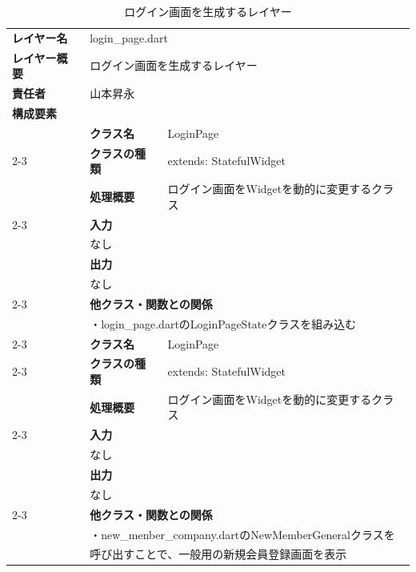 \documentclass{article}
\begin{document}
\begin{table}[htbp]
\centering
\caption{ログイン画面を生成するレイヤー}
\begin{tabularx}{\linewidth}{llp{20cm}}
    
    \cellcolor[HTML]{C0C0C0}\textbf{レイヤー名} & \multicolumn{2}{l}{login\_page.dart} \\ 
    \cellcolor[HTML]{C0C0C0}\textbf{レイヤー概要} & \multicolumn{2}{l}{ログイン画面を生成するレイヤー} \\
    \cellcolor[HTML]{C0C0C0}\textbf{責任者} & \multicolumn{2}{l}{山本昇永} \\ 
    \midrule
    \multicolumn{1}{l}{\cellcolor[HTML]{C0C0C0}\textbf{構成要素}}       & \multicolumn{2}{l}{\cellcolor[HTML]{C0C0C0}}  \\
& \cellcolor[HTML]{EFEFEF}\textbf{クラス名}   & \multicolumn{1}{l}{LoginPage}                \\
    \cmidrule{2-3}
& \cellcolor[HTML]{EFEFEF}\textbf{クラスの種類} & \multicolumn{1}{l}{extends: StatefulWidget}  \\
& \cellcolor[HTML]{EFEFEF}\textbf{処理概要}   & \multicolumn{1}{l}{ログイン画面をWidgetを動的に変更するクラス} \\
\cmidrule{2-3}
& \multicolumn{2}{l}{\cellcolor[HTML]{EFEFEF}\textbf{入力}}                                \\
& \multicolumn{2}{l}{なし}     \\
& \multicolumn{2}{l}{\cellcolor[HTML]{EFEFEF}\textbf{出力}} \\
& \multicolumn{2}{l}{なし} \\
\cmidrule{2-3}
& \multicolumn{2}{l}{\cellcolor[HTML]{EFEFEF}\textbf{他クラス・関数との関係}} \\
& \multicolumn{2}{l}{・login\_page.dartのLoginPageStateクラスを組み込む} \\
\cmidrule{2-3}
& \cellcolor[HTML]{EFEFEF}\textbf{クラス名}   & \multicolumn{1}{l}{LoginPage}                \\
    \cmidrule{2-3}
& \cellcolor[HTML]{EFEFEF}\textbf{クラスの種類} & \multicolumn{1}{l}{extends: StatefulWidget}  \\
& \cellcolor[HTML]{EFEFEF}\textbf{処理概要}   & \multicolumn{1}{l}{ログイン画面をWidgetを動的に変更するクラス} \\
\cmidrule{2-3}
& \multicolumn{2}{l}{\cellcolor[HTML]{EFEFEF}\textbf{入力}}                                \\
& \multicolumn{2}{l}{なし}     \\
& \multicolumn{2}{l}{\cellcolor[HTML]{EFEFEF}\textbf{出力}} \\
& \multicolumn{2}{l}{なし} \\
\cmidrule{2-3}
& \multicolumn{2}{l}{\cellcolor[HTML]{EFEFEF}\textbf{他クラス・関数との関係}} \\
& \multicolumn{2}{l}{・new\_menber\_company.dartのNewMemberGeneralクラスを} \\
& \multicolumn{2}{l}{呼び出すことで、一般用の新規会員登録画面を表示} \\
\bottomrule

    
\end{tabularx}
\end{table}
\end{document}
